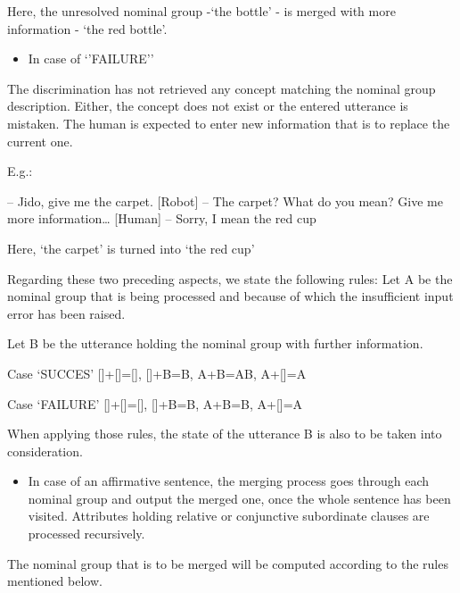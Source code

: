 \documentclass[twoside,a4paper,10pt]{report}
\begin{document}
Here, the unresolved nominal group -‘the bottle’ - is merged with more information - ‘the red bottle’.



\begin{itemize}
    \item  In case of ‘’FAILURE’’
\end{itemize}
The discrimination has not retrieved any concept matching the nominal group description. Either, the concept does not exist or the entered utterance is mistaken. The human is expected to enter new information that is to replace the current one.

E.g.:


\small
\begin{verbatimtab}
  [Human] – Jido, give me the carpet.
  [Robot] – The carpet? What do you mean? Give me more information…
  [Human] – Sorry, I mean the red cup
\end{verbatimtab}
\normalsize

Here, ‘the carpet’ is turned into ‘the red cup’

Regarding these two preceding aspects, we state the following rules:
Let A be the nominal group that is being processed and because of which the insufficient input error has been raised.

Let B be the utterance holding the nominal group with further information.


\small
\begin{verbatimtab}
  Case ‘SUCCES’ {
  []+[]=[], 
  []+B=B, 
  A+B=AB, 
  A+[]=A
      }
\end{verbatimtab}
\normalsize

\small
\begin{verbatimtab}
  Case ‘FAILURE’ {
  []+[]=[], 
  []+B=B, 
  A+B=B,  
  A+[]=A
      }
\end{verbatimtab}
\normalsize

When applying those rules, the state of the utterance B is also to be taken into consideration.


\begin{itemize}
    \item  In case of an affirmative sentence, the merging process goes through each nominal group and output the merged one, once the whole sentence has been visited. Attributes holding relative or conjunctive subordinate clauses are processed recursively.
\end{itemize}
The nominal group that is to be merged will be computed according to the rules mentioned below.
\end{document}
